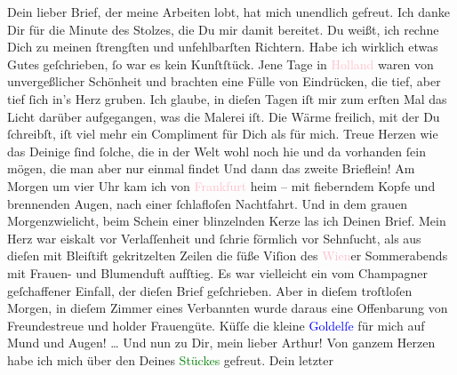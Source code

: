                Dein lieber Brief, der meine Arbeiten lobt, hat mich unendlich gefreut. Ich danke Dir
               für die Minute des Stolzes, die Du mir damit bereitet. Du weißt, ich rechne Dich zu
               meinen ſtrengſten und unfehlbarſten Richtern. Habe ich wirklich etwas Gutes
               geſchrieben, ſo war es kein Kunſtſtück. Jene Tage in \textcolor{pink}{Holland}{}\ledrightnote{\textcolor{pink}{Niederlande}} waren von unvergeßlicher Schönheit und brachten eine Fülle von
               Eindrücken, die tief,  aber tief ſich in’s Herz gruben. Ich glaube, in
               dieſen Tagen iſt mir zum erſten Mal das Licht darüber aufgegangen, was die Malerei
               iſt. Die Wärme freilich, mit der Du ſchreibſt, iſt \strikeout{\textcolor{gray}{fie}} viel mehr {\pb}ein Compliment für Dich als für
               mich. Treue Herzen wie das Deinige ſind ſolche, die in der Welt wohl noch hie und da
               vorhanden ſein mögen, die man aber nur einmal findet{\dotsfour} Und
               dann das zweite Brieflein! Am Morgen um vier Uhr kam ich  von \textcolor{pink}{Frankfurt}{}\ledrightnote{\textcolor{pink}{Frankfurt am Main}}
               heim – mit fieberndem Kopfe und brennenden Augen, nach einer ſchlafloſen Nachtfahrt.
               Und in dem grauen Morgenzwielicht, beim Schein einer blinzelnden Kerze las ich Deinen
               Brief. Mein Herz war eiskalt vor Verlaſſenheit und ſchrie förmlich vor Sehnſucht, als
               aus dieſen mit Bleiſtift gekritzelten Zeilen die ſüße Viſion des \textcolor{pink}{Wien}{}\ledrightnote{\textcolor{pink}{Wien}}er Sommerabends mit Frauen- und Blumenduft aufſtieg. Es war
               vielleicht ein vom Champagner geſchaffener Einfall, der dieſen Brief geſchrieben.
               Aber in dieſem troſtloſen Morgen, in dieſem Zimmer eines Verbannten wurde daraus eine
               Offenbarung von Freundestreue und holder Frauengüte. Küſſe die kleine \textcolor{blue}{Goldelſe}{} für
               mich auf Mund und Augen! {\dots}\pend
           \pstart
           {\pb}Und nun zu Dir, mein lieber Arthur! Von ganzem
               Herzen habe ich mich über den \label{K_L02668-3v}\label{K_L02668-3h} Deines \textcolor{green}{Stückes}{} gefreut. Dein letzter
